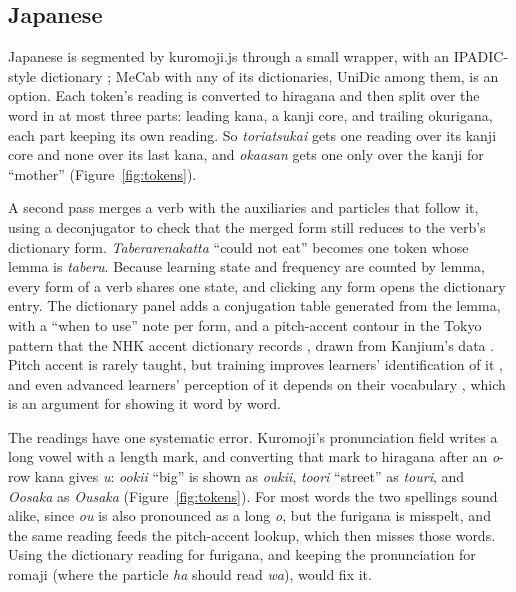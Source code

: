 ﻿\documentclass[11pt,a4paper]{article}
\begin{document}
\subsection{Japanese}

Japanese is segmented by kuromoji.js \citep{kuromojijs} through a small wrapper, with an IPADIC-style dictionary \citep{ipadic}; MeCab \citep{kudo2004applying,mecab} with any of its dictionaries, UniDic \citep{den2008proper,unidic} among them, is an option. Each token's reading is converted to hiragana and then split over the word in at most three parts: leading kana, a kanji core, and trailing okurigana, each part keeping its own reading. So \emph{toriatsukai} gets one reading over its kanji core and none over its last kana, and \emph{okaasan} gets one only over the kanji for ``mother'' (Figure~\ref{fig:tokens}).

A second pass merges a verb with the auxiliaries and particles that follow it, using a deconjugator to check that the merged form still reduces to the verb's dictionary form. \emph{Taberarenakatta} ``could not eat'' becomes one token whose lemma is \emph{taberu}. Because learning state and frequency are counted by lemma, every form of a verb shares one state, and clicking any form opens the dictionary entry. The dictionary panel adds a conjugation table generated from the lemma, with a ``when to use'' note per form, and a pitch-accent contour in the Tokyo pattern that the NHK accent dictionary records \citep{nhk2016accent}, drawn from Kanjium's data \citep{kanjium}. Pitch accent is rarely taught, but training improves learners' identification of it \citep{shport2016training}, and even advanced learners' perception of it depends on their vocabulary \citep{goss2019lexical}, which is an argument for showing it word by word.

The readings have one systematic error. Kuromoji's pronunciation field writes a long vowel with a length mark, and converting that mark to hiragana after an \emph{o}-row kana gives \emph{u}: \emph{ookii} ``big'' is shown as \emph{oukii}, \emph{toori} ``street'' as \emph{touri}, and \emph{Oosaka} as \emph{Ousaka} (Figure~\ref{fig:tokens}). For most words the two spellings sound alike, since \emph{ou} is also pronounced as a long \emph{o}, but the furigana is misspelt, and the same reading feeds the pitch-accent lookup, which then misses those words. Using the dictionary reading for furigana, and keeping the pronunciation for romaji (where the particle \emph{ha} should read \emph{wa}), would fix it.
\end{document}
